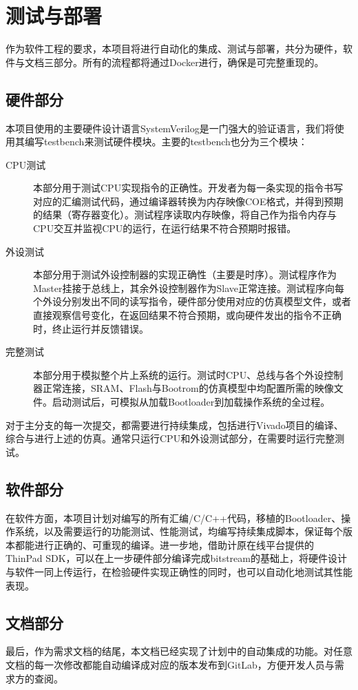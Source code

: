 \chapter{测试与部署}

作为软件工程的要求，本项目将进行自动化的集成、测试与部署，共分为硬件，软件与文档三部分。所有的流程都将通过Docker进行，确保是可完整重现的。

\section{硬件部分}

本项目使用的主要硬件设计语言SystemVerilog是一门强大的验证语言，我们将使用其编写testbench来测试硬件模块。主要的testbench也分为三个模块：

\begin{description}
    \item[CPU测试] 本部分用于测试CPU实现指令的正确性。开发者为每一条实现的指令书写对应的汇编测试代码，通过编译器转换为内存映像COE格式，并得到预期的结果（寄存器变化）。测试程序读取内存映像，将自己作为指令内存与CPU交互并监视CPU的运行，在运行结果不符合预期时报错。
    \item[外设测试] 本部分用于测试外设控制器的实现正确性（主要是时序）。测试程序作为Master挂接于总线上，其余外设控制器作为Slave正常连接。测试程序向每个外设分别发出不同的读写指令，硬件部分使用对应的仿真模型文件，或者直接观察信号变化，在返回结果不符合预期，或向硬件发出的指令不正确时，终止运行并反馈错误。
    \item[完整测试] 本部分用于模拟整个片上系统的运行。测试时CPU、总线与各个外设控制器正常连接，SRAM、Flash与Bootrom的仿真模型中均配置所需的映像文件。启动测试后，可模拟从加载Bootloader到加载操作系统的全过程。
\end{description}

对于主分支的每一次提交，都需要进行持续集成，包括进行Vivado项目的编译、综合与进行上述的仿真。通常只运行CPU和外设测试部分，在需要时运行完整测试。

\section{软件部分}

在软件方面，本项目计划对编写的所有汇编/C/C++代码，移植的Bootloader、操作系统，以及需要运行的功能测试、性能测试，均编写持续集成脚本，保证每个版本都能进行正确的、可重现的编译。进一步地，借助计原在线平台提供的 ThinPad SDK，可以在上一步硬件部分编译完成bitstream的基础上，将硬件设计与软件一同上传运行，在检验硬件实现正确性的同时，也可以自动化地测试其性能表现。

\section{文档部分}

最后，作为需求文档的结尾，本文档已经实现了计划中的自动集成的功能。对任意文档的每一次修改都能自动编译成对应的版本发布到GitLab，方便开发人员与需求方的查阅。